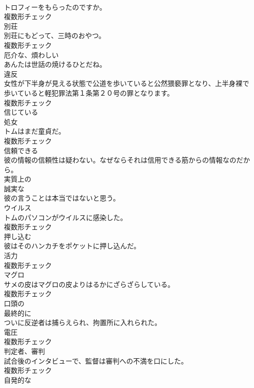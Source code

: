 \documentclass[8pt]{extreport}
\begin{document}
\begin{CJK}{UTF8}{min}
\\	トロフィーをもらったのですか。	
\\	複数形チェック
\\	[名詞]	別荘	
\\	別荘にもどって、三時のおやつ。	
\\	複数形チェック
\\	[形容詞]	厄介な、煩わしい	
\\	あんたは世話の焼けるひとだね。	
\\	[名詞]	違反	
\\	女性が下半身が見える状態で公道を歩いていると公然猥褻罪となり、上半身裸で歩いていると軽犯罪法第１条第２０号の罪となります。	
\\	複数形チェック
\\	[形容詞]	信じている	
\\	[名詞]	処女	
\\	トムはまだ童貞だ。	
\\	複数形チェック
\\	[形容詞]	信頼できる	
\\	彼の情報の信頼性は疑わない。なぜならそれは信用できる筋からの情報なのだから。	
\\	[形容詞]	実質上の	
\\	[形容詞]	誠実な	
\\	彼の言うことは本当ではないと思う。	
\\	[名詞]	ウイルス	
\\	トムのパソコンがウイルスに感染した。	
\\	複数形チェック
\\	[動詞]	押し込む	
\\	彼はそのハンカチをポケットに押し込んだ。	
\\	[名詞]	活力	
\\	複数形チェック
\\	[名詞]	マグロ	
\\	サメの皮はマグロの皮よりはるかにざらざらしている。	
\\	複数形チェック
\\	[形容詞]	口頭の	
\\	[副詞]	最終的に	
\\	ついに反逆者は捕らえられ、拘置所に入れられた。	
\\	[名詞]	電圧	
\\	複数形チェック
\\	[名詞]	判定者、審判	
\\	試合後のインタビューで、監督は審判への不満を口にした。	
\\	複数形チェック
\\	[形容詞]	自発的な	

\end{CJK}
\end{document}
